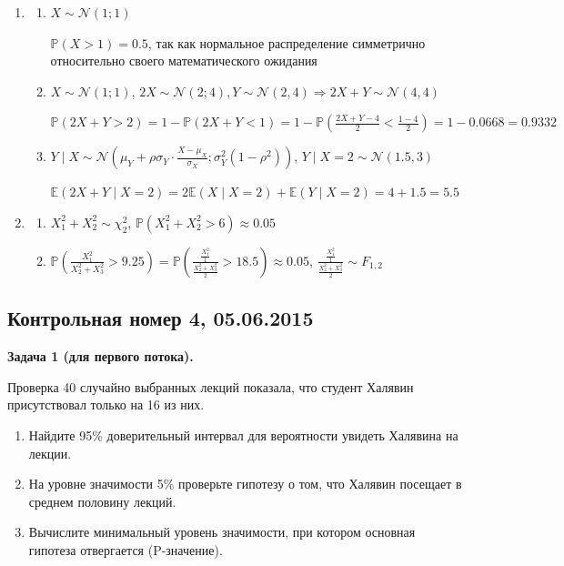 \documentclass[12pt, a4paper]{article}\usepackage[]{graphicx}\usepackage[]{color}
\begin{document}
\begin{enumerate}
					\item
					\begin{enumerate}
						\item $X \sim \mathcal{N} (1;1)$

						$\mathbb{P}(X>1) = 0.5$, так как нормальное распределение симметрично относительно своего математического ожидания

						\item $X \sim \mathcal{N} (1;1)$, $2X \sim \mathcal{N}(2; 4), Y \sim \mathcal{N}(2, 4) \Rightarrow 2X+Y \sim \mathcal{N} (4, 4)$

						$\mathbb{P}(2X+Y > 2) = 1 - \mathbb{P}(2X+Y < 1) = 1 - \mathbb{P}\left(\frac{2X+Y - 4}{2} < \frac{1-4}{2}\right) = 1 - 0.0668 = 0.9332$

						\item $Y \mid X \sim \mathcal{N}\left(\mu_Y + \rho\sigma_Y\cdot\frac{X-\mu_X}{\sigma_X}; \sigma_Y^2(1-\rho^2)\right)$, $Y \mid X=2 \sim \mathcal{N}(1.5, 3)$

						$\mathbb{E}(2X+Y \mid X=2) = 2\mathbb{E} (X\mid X=2) + \mathbb{E}(Y\mid X=2) = 4 + 1.5 = 5.5$
					\end{enumerate}

					\item
					\begin{enumerate}
						\item $X_1^2 + X_2^2 \sim \chi^2_2$, $\mathbb{P}(X_1^2 + X_2^2 > 6)  \approx 0.05$
						\item $\mathbb{P}\left(\frac{X_1^2}{X_2^2+X_3^2} > 9.25\right) = \mathbb{P}\left(\frac{\frac{X_1^2}{1}}{\frac{X_2^2+X_3^2}{2}} > 18.5\right) \approx 0.05$, $\frac{\frac{X_1^2}{1}}{\frac{X_2^2+X_3^2}{2}} \sim F_{1, 2}$
					\end{enumerate}
				\end{enumerate}

				\subsection{Контрольная номер 4, 05.06.2015}


				\textbf{Задача 1 (для первого потока).}

				Проверка  40 случайно выбранных лекций показала, что студент Халявин присутствовал только на 16 из них.
				\begin{enumerate}
					\item Найдите 95\% доверительный интервал для вероятности увидеть Халявина на лекции.
					\item На уровне значимости 5\% проверьте гипотезу о том, что Халявин посещает в среднем половину лекций.
					\item Вычислите минимальный уровень значимости, при котором основная гипотеза отвергается (P-значение).
				\end{enumerate}
\end{document}
